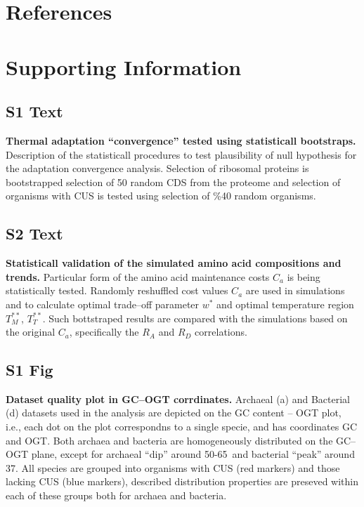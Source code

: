 \documentclass[10pt,letterpaper]{article}
\begin{document}
\section*{References}
%
%
% 




\section*{Supporting Information}

\subsection*{S1 Text}
\label{text:s1}
{\bf Thermal adaptation ``convergence'' tested using statisticall bootstraps.}
Description of the statisticall procedures to test plausibility of null hypothesis for the adaptation convergence analysis. Selection of ribosomal proteins is bootstrapped selection of 50 random CDS from the proteome and selection of organisms with CUS is tested using selection of \%40 random organisms.


\subsection*{S2 Text}
\label{text:s2}
{\bf Statisticall validation of the simulated amino acid compositions and trends.}
Particular form of the amino acid maintenance costs $C_{a}$ is being statistically tested.
Randomly reshuffled cost values $C_{a}$ are used in simulations and to calculate optimal trade--off parameter $w^*$ and optimal temperature region $T^{**}_M$, $T^{**}_T$. Such bottstraped results are compared with the simulations based on the original $C_{a}$, specifically the $R_A$ and $R_D$ correlations.



\subsection*{S1 Fig}
\label{fig:s1}
{\bf Dataset quality plot in GC--OGT corrdinates.}
Archaeal (a) and Bacterial (d) datasets used in the analysis are depicted on the GC content -- OGT plot, i.e., each dot on the plot correspondns to a single specie, and has coordinates GC and OGT. Both archaea and bacteria are homogeneously distributed on the GC--OGT plane, except for archaeal ``dip'' around 50-65\textcelsius\  and bacterial ``peak'' around 37\textcelsius. All species are grouped into organisms with CUS (red markers) and those lacking CUS (blue markers), described distribution properties are preseved within each of these groups both for archaea and bacteria.
\end{document}
